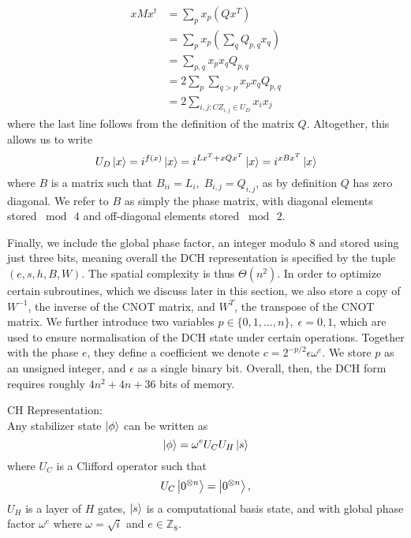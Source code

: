 \begin{align}
xMx^{t} &= \sum_{p} x_{p} \left(Qx^{T}\right) \nonumber \\
&= \sum_{p}x_{p}\left(\sum_{q}Q_{p,q} x_{q}\right) \nonumber \\
&= \sum_{p,q} x_{p}x_{q} Q_{p,q}\nonumber \\
&= 2\sum_{p}\sum_{q>p} x_{p}x_{q} Q_{p,q} \nonumber \\
&= 2\sum_{i,j : CZ_{i,j}\in U_{D}} x_{i}x_{j} \nonumber
\end{align}
where the last line follows from the definition of the matrix $Q$. Altogether, this allows us to write~\cite{Bravyi2016}
\begin{equation}
U_{D}\ket{x} = i^{f(x)}\ket{x} = i^{Lx^{T} + xQx^{T}}\ket{x} = i^{xBx^{T}}\ket{x}
\label{eq:phase_encoding}
\end{equation}
where $B$ is a matrix such that $B_{ii}=L_{i},\;B_{i,j}=Q_{i,j}$, as by definition $Q$ has zero diagonal. We refer to $B$ as simply the phase matrix, with diagonal elements stored $\bmod\,4$ and off-diagonal elements stored $\bmod\,2$.\par
Finally, we include the global phase factor, an integer modulo $8$ and stored using just three bits, meaning overall the DCH representation is specified by the tuple $\left(e, s, h, B, W\right)$. The spatial complexity is thus $\Theta(n^{2})$. In order to optimize certain subroutines, which we discuss later in this section, we also store a copy of $W^{-1}$, the inverse of the CNOT matrix, and $W^{T}$, the transpose of the CNOT matrix. We further introduce two variables $p\in\{0,1,\dots,n\},\;\epsilon=0,1$, which are used to ensure normalisation of the DCH state under certain operations. Together with the phase $e$, they define a coefficient we denote $c=2^{-p/2}\epsilon \omega^{e}$. We store $p$ as an unsigned integer, and $\epsilon$ as a single binary bit. Overall, then, the DCH form requires roughly $4n^{2}+4n+36$ bits of memory.
\begin{defn}
CH Representation:\\
Any stabilizer state $\ket{\phi}$ can be written as
\begin{equation}
\ket{\phi} = \omega^{e} U_{C}U_{H}\ket{s}
\label{eq:ch}
\end{equation}
where $U_{C}$ is a Clifford operator such that
\begin{equation}
U_{C}\ket{0^{\otimes n}} = \ket{0^{\otimes n}},
\end{equation}
$U_{H}$ is a layer of $H$ gates, $\ket{s}$ is a computational basis state, and with global phase factor $\omega^{e}$ where $\omega=\sqrt{i}$ and $e\in\mathbb{Z}_{8}$.\label{def:ch}
\end{defn}
